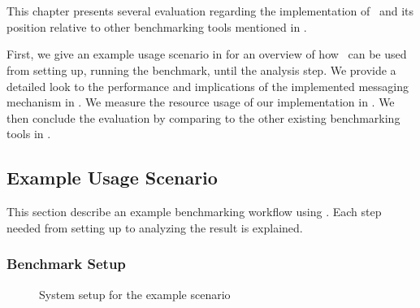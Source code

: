 \chapter{\chEvaluation}
\label{ch:evaluation}

This chapter presents several evaluation regarding the implementation of \OurBenchmarkingTool~and its position relative to other benchmarking tools mentioned in .

First, we give an example usage scenario in  for an overview of how \OurBenchmarkingTool~can be used from setting up, running the benchmark, until the analysis step.
We provide a detailed look to the performance and implications of the implemented messaging mechanism in .
We measure the resource usage of our implementation in .
We then conclude the evaluation by comparing \OurBenchmarkingTool to the other existing benchmarking tools in .

\section{Example Usage Scenario}
\label{sec:eval.scenario}

This section describe an example benchmarking workflow using \OurBenchmarkingTool.
Each step needed from setting up to analyzing the result is explained.

\subsection{Benchmark Setup}

\begin{figure}
    \centering
    \caption{System setup for the example scenario}
    \label{fig:eval.setup}
\end{figure}

